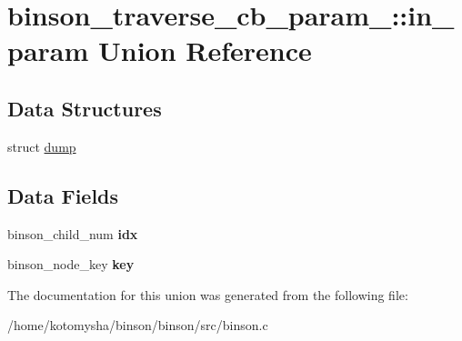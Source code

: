 \hypertarget{unionbinson__traverse__cb__param___1_1in__param}{\section{binson\-\_\-traverse\-\_\-cb\-\_\-param\-\_\-\-:\-:in\-\_\-param Union Reference}
\label{unionbinson__traverse__cb__param___1_1in__param}
}
\subsection*{Data Structures}
\begin{DoxyCompactItemize}
\item 
struct \hyperlink{structbinson__traverse__cb__param___1_1in__param_1_1dump}{dump}
\end{DoxyCompactItemize}
\subsection*{Data Fields}
\begin{DoxyCompactItemize}
\item 
\hypertarget{unionbinson__traverse__cb__param___1_1in__param_ac328ae4d4e784011c1da7ffd9d9e852b}{binson\-\_\-child\-\_\-num {\bfseries idx}}\label{unionbinson__traverse__cb__param___1_1in__param_ac328ae4d4e784011c1da7ffd9d9e852b}

\item 
\hypertarget{unionbinson__traverse__cb__param___1_1in__param_ae57a761b3cf250f4be0a9ad12e0e5725}{binson\-\_\-node\-\_\-key {\bfseries key}}\label{unionbinson__traverse__cb__param___1_1in__param_ae57a761b3cf250f4be0a9ad12e0e5725}

\end{DoxyCompactItemize}


The documentation for this union was generated from the following file\-:\begin{DoxyCompactItemize}
\item 
/home/kotomysha/binson/binson/src/binson.\-c\end{DoxyCompactItemize}
